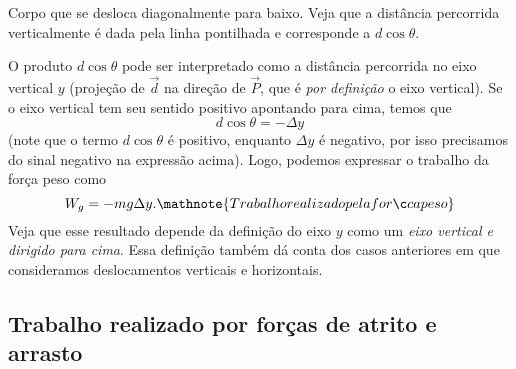 \begin{marginfigure}
\centering
{}
\caption{Corpo que se desloca diagonalmente para baixo. Veja que a distância percorrida verticalmente é dada pela linha pontilhada e corresponde a $d\cos\theta$. \label{Fig:DeslocamentoCorpoDiagonal}}
\end{marginfigure}
%
\noindent{}O produto $d\cos\theta$ pode ser interpretado como a distância percorrida no eixo vertical $y$ (projeção de $\vec{d}$ na direção de $\vec{P}$, que é \emph{por definição} o eixo vertical). Se o eixo vertical tem seu sentido positivo apontando para cima, temos que
\begin{equation}
    d\cos\theta = - \Delta y
\end{equation}
%
(note que o termo $d\cos\theta$ é positivo, enquanto $\Delta y$ é negativo, por isso precisamos do sinal negativo na expressão acima). Logo, podemos expressar o trabalho da força peso como
\begin{equation}\label{Eq:TrabalhoPeso}
  W_g = - mg\Delta y. \mathnote{Trabalho realizado pela força peso}
\end{equation}
%
Veja que esse resultado depende da definição do eixo $y$ como um \emph{eixo vertical e dirigido para cima}. Essa definição também dá conta dos casos anteriores em que consideramos deslocamentos verticais e horizontais.
  
\subsection{Trabalho realizado por forças de atrito e arrasto}

